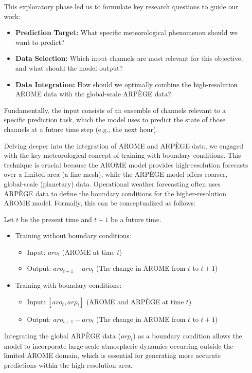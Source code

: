 This exploratory phase led us to formulate key research questions to guide our work:
\begin{itemize}
\item \textbf{Prediction Target:} What specific meteorological phenomenon should we want to predict?
\item \textbf{Data Selection:} Which input channels are most relevant for this objective, and what should the model output?
\item \textbf{Data Integration:} How should we optimally combine the high-resolution AROME data with the global-scale ARPÈGE data?
\end{itemize}

Fundamentally, the input consists of an ensemble of channels relevant to a specific prediction task, which the model uses to predict the state of those channels at a future time step (e.g., the next hour).

Delving deeper into the integration of AROME and ARPÈGE data, we engaged with the key meteorological concept of training with boundary conditions. This technique is crucial because the AROME model provides high-resolution forecasts over a limited area (a fine mesh), while the ARPÈGE model offers coarser, global-scale (planetary) data. Operational weather forecasting often uses ARPÈGE data to define the boundary conditions for the higher-resolution AROME model. Formally, this can be conceptualized as follows:

Let $t$ be the present time and $t + 1$ be a future time.
\begin{itemize}
	\item Training without boundary conditions:
		\begin{itemize}
			\item Input: $aro_t$ (AROME at time $t$)
			\item Output: $aro_{t+1} - aro_t$ (The change in AROME from $t$ to $t+1$)
		\end{itemize}

	\item Training with boundary conditions:
		\begin{itemize}
			\item Input: $[aro_t, arp_t]$ (AROME and ARPÈGE at time $t$)
			\item Output: $aro_{t+1} - aro_t$ (The change in AROME from $t$ to $t+1$)
		\end{itemize}
\end{itemize}

Integrating the global ARPÈGE data ($arp_t$) as a boundary condition allows the model to incorporate large-scale atmospheric dynamics occurring outside the limited AROME domain, which is essential for generating more accurate predictions within the high-resolution area.

